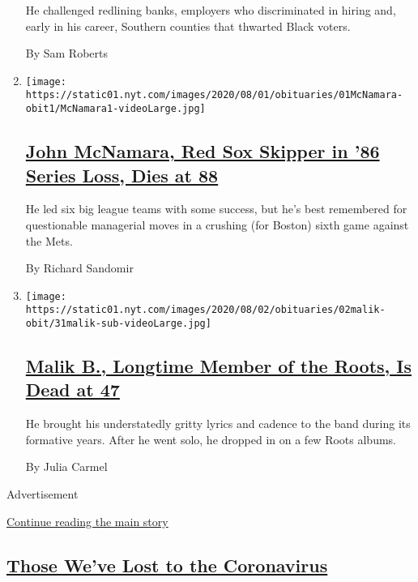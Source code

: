 \begin{enumerate}
  He challenged redlining banks, employers who discriminated in hiring
  and, early in his career, Southern counties that thwarted Black
  voters.

  By Sam Roberts
\item
  \texttt{[image: https://static01.nyt.com/images/2020/08/01/obituaries/01McNamara-obit1/McNamara1-videoLarge.jpg]}

  \hypertarget{john-mcnamara-red-sox-skipper-in-86-series-loss-dies-at-88}{%
  \subsection{\texorpdfstring{\href{/2020/07/31/sports/baseball/john-mcnamara-dead.html}{John
  McNamara, Red Sox Skipper in '86 Series Loss, Dies at
  88}}{John McNamara, Red Sox Skipper in '86 Series Loss, Dies at 88}}\label{john-mcnamara-red-sox-skipper-in-86-series-loss-dies-at-88}}

  He led six big league teams with some success, but he's best
  remembered for questionable managerial moves in a crushing (for
  Boston) sixth game against the Mets.

  By Richard Sandomir
\item
  \texttt{[image: https://static01.nyt.com/images/2020/08/02/obituaries/02malik-obit/31malik-sub-videoLarge.jpg]}

  \hypertarget{malik-b-longtime-member-of-the-roots-is-dead-at-47}{%
  \subsection{\texorpdfstring{\href{/2020/07/31/arts/music/malik-b-dead.html}{Malik
  B., Longtime Member of the Roots, Is Dead at
  47}}{Malik B., Longtime Member of the Roots, Is Dead at 47}}\label{malik-b-longtime-member-of-the-roots-is-dead-at-47}}

  He brought his understatedly gritty lyrics and cadence to the band
  during its formative years. After he went solo, he dropped in on a few
  Roots albums.

  By Julia Carmel
\end{enumerate}

Advertisement

\protect\hyperlink{after-mid1}{Continue reading the main story}

\hypertarget{those-weve-lost-to-the-coronavirus}{%
\subsection{\texorpdfstring{\href{/series/people-died-coronavirus-obituaries}{Those
We've Lost to the
Coronavirus}}{Those We've Lost to the Coronavirus}}\label{those-weve-lost-to-the-coronavirus}}

